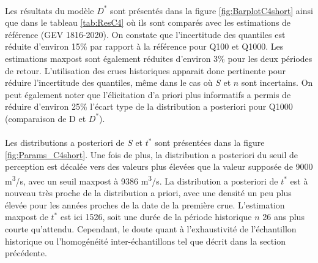 	\paragraph{} Les résultats du modèle $D^*$ sont présentés dans la figure \ref{fig:BarplotC4short} ainsi que dans le tableau \ref{tab:ResC4} où ils sont comparés avec les estimations de référence (GEV 1816-2020). On constate que l'incertitude des quantiles est réduite d'environ 15\% par rapport à la référence pour Q100 et Q1000. Les estimations maxpost sont également réduites d'environ 3\% pour les deux périodes de retour. L'utilisation des crues historiques apparait donc pertinente pour réduire l'incertitude des quantiles, même dans le cas où $S$ et $n$ sont incertains. On peut également noter que l'élicitation d'a priori plus informatifs a permis de réduire d'environ 25\% l'écart type de la distribution a posteriori pour Q1000 (comparaison de D et $D^*$). 

%
%
		
	\paragraph{} Les distributions a posteriori de $S$ et $t^{*}$ sont présentées dans la figure \ref{fig:Params_C4short}. Une fois de plus, la distribution a posteriori du seuil de perception est décalée vers des valeurs plus élevées que la valeur supposée de 9000 m\textsuperscript{3}/s, avec un seuil maxpost à 9386 m\textsuperscript{3}/s. La distribution a posteriori de $t^{*}$ est à nouveau très proche de la distribution a priori, avec une densité un peu plus élevée pour les années proches de la date de la première crue. L'estimation maxpost de $t^{*}$ est ici 1526, soit une durée de la période historique $n$ 26 ans plus courte qu'attendu. Cependant, le doute quant à l'exhaustivité de l'échantillon historique ou l'homogénéité inter-échantillons tel que décrit dans la section précédente.
			
